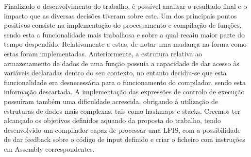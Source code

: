 \documentclass[a4paper,10pt]{report}
\begin{document}
Finalizado o desenvolvimento do trabalho, é possível analisar o resultado final e o impacto que as diversas decisões tiveram sobre este. Um dos principais pontos positivos consiste na implementação do processamento e compilação de funções, sendo esta a funcionalidade mais trabalhosa e sobre a qual recaiu maior parte do tempo despendido. Relativamente a estas, de notar uma mudança na forma como estas foram implementadas. Anteriormente, a estrutura relativa ao armazenamento de dados de uma função possuía a capacidade de dar acesso às variáveis declaradas dentro do seu contexto, no entanto decidiu-se que esta funcionalidade era desnecessária para o funcionamento do compilador, sendo esta informação descartada. A implementação das expressões de controlo de execução possuíram também uma dificuldade acrescida, obrigando à utilização de estruturas de dados mais complexas, tais como hashmaps e stacks. Creemos ter alcançado os objetivos definidos aquando da proposta do trabalho, tendo desenvolvido um compilador capaz de processar uma LPIS, com a possibilidade de dar feedback sobre o código de input definido e criar o ficheiro com instruções em Assembly correspondentes.
\end{document}
